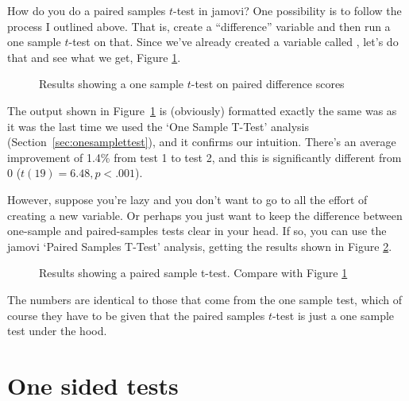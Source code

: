 
How do you do a paired samples $t$-test in jamovi? One possibility is to follow the process I outlined above. That is, create a ``difference'' variable and then run a one sample $t$-test on that. Since we've already created a variable called , let's do that and see what we get, Figure \ref{fig:ttest_paired2}.

\begin{figure}[htb]
\begin{center}
\caption{Results showing a one sample $t$-test on paired difference scores}
\label{fig:ttest_paired2}
\HR
\end{center}
\end{figure}

The output shown in Figure~\ref{fig:ttest_paired2} is (obviously) formatted exactly the same was as it was the last time we used the `One Sample T-Test' analysis (Section~\ref{sec:onesamplettest}), and it confirms our intuition. There's an average improvement of 1.4\% from test 1 to test 2, and this is significantly different from 0 ($t(19)=6.48, p<.001$). 

However, suppose you're lazy and you don't want to go to all the effort of creating a new variable. Or perhaps you just want to keep the difference between one-sample and paired-samples tests clear in your head. If so, you can use the jamovi `Paired Samples T-Test' analysis, getting the results shown in Figure \ref{fig:ttest_paired3}.

\begin{figure}[htb]
\begin{center}
\caption{Results showing a paired sample t-test. Compare with Figure \ref{fig:ttest_paired2}}
\label{fig:ttest_paired3}
\HR
\end{center}
\end{figure}

The numbers are identical to those that come from the one sample test, which of course they have to be given that the paired samples $t$-test is just a one sample test under the hood. 


\section{One sided tests~\label{sec:onesidedttest}}

